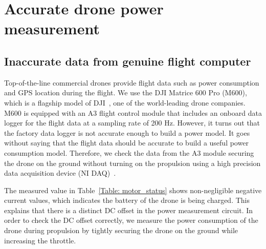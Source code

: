 \documentclass[journal]{./template/IEEEtran}
\begin{document}
\section{Accurate drone power measurement}
\label{Section: Challenges in drone power measurement}
\subsection{Inaccurate data from genuine flight computer}
Top-of-the-line commercial drones provide flight data such as power consumption and GPS location during the flight. 
We use the DJI Matrice 600 Pro (M600), which is a flagship model of DJI~\cite{ref_11}, one of the world-leading drone companies. 
M600 is equipped with an A3 flight control module that includes an onboard data logger for the flight data at a sampling rate of 200 Hz. However, it turns out that the factory data logger is not accurate enough to build a power model. It goes without saying that the flight data should be accurate to build a useful power consumption model.
Therefore, we check the data from the A3 module securing the drone on the ground without turning on the propulsion using a high precision data acquisition device (NI DAQ)~\cite{ref_12}.

\begin{table}[ht]
\caption{An example of inaccurate data from the genuine flight module of M600 drone when it is parked as a ready state on the ground. (All motors and propellers are fully stopped.)}
\label{Table: motor_status}
\end{table}

The measured value in Table~\ref{Table: motor_status} shows non-negligible negative current values, which indicates the battery of the drone is being charged.
This explains that there is a distinct DC offset in the power measurement circuit.
In order to check the DC offset correctly, we measure the power consumption of the drone during propulsion by tightly securing the drone on the ground while increasing the throttle.
\end{document}
